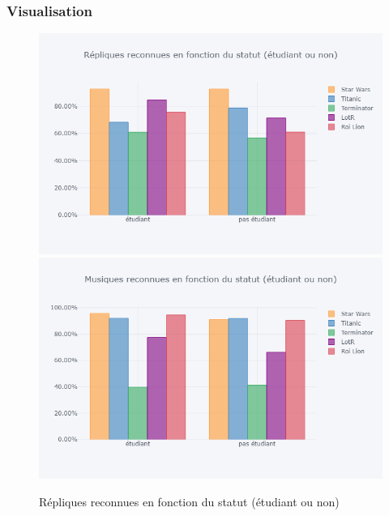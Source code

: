 \documentclass{article} %
\begin{document}
\subsubsection{Visualisation}
\begin{figure}[!h]
	\includegraphics[keepaspectratio,scale=0.33]{h10.png}
	\includegraphics[keepaspectratio,scale=0.33]{h101.png}
	\caption{Répliques reconnues en fonction du statut (étudiant ou non)}
\end{figure}~\\
\end{document}
